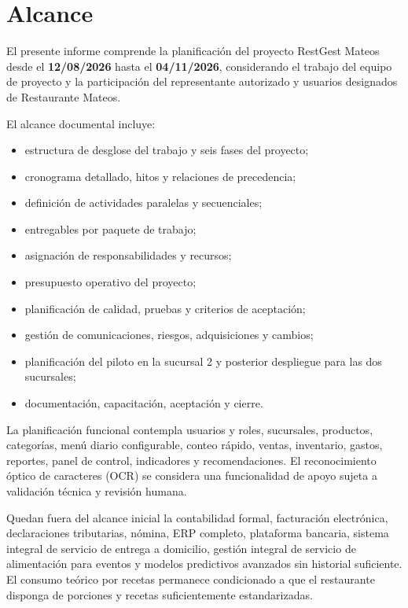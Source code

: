 \documentclass[12pt,a4paper]{article}
\begin{document}
\section{Alcance}

El presente informe comprende la planificación del proyecto RestGest Mateos desde el \textbf{12/08/2026} hasta el 
\textbf{04/11/2026}, considerando el trabajo del equipo de proyecto y la participación del representante autorizado y usuarios 
designados de Restaurante Mateos.

El alcance documental incluye:

\begin{itemize}
    \item estructura de desglose del trabajo y seis fases del proyecto;
    \item cronograma detallado, hitos y relaciones de precedencia;
    \item definición de actividades paralelas y secuenciales;
    \item entregables por paquete de trabajo;
    \item asignación de responsabilidades y recursos;
    \item presupuesto operativo del proyecto;
    \item planificación de calidad, pruebas y criterios de aceptación;
    \item gestión de comunicaciones, riesgos, adquisiciones y cambios;
    \item planificación del piloto en la sucursal 2 y posterior despliegue para las dos sucursales;
    \item documentación, capacitación, aceptación y cierre.
\end{itemize}

La planificación funcional contempla usuarios y roles, sucursales, productos, categorías, menú diario configurable, conteo rápido, 
ventas, inventario, gastos, reportes, panel de control, indicadores y recomendaciones. El reconocimiento óptico de caracteres (OCR) se 
considera una funcionalidad de apoyo sujeta a validación técnica y revisión humana.

Quedan fuera del alcance inicial la contabilidad formal, facturación electrónica, declaraciones tributarias, nómina, ERP completo, 
plataforma bancaria, sistema integral de servicio de entrega a domicilio, gestión integral de servicio de alimentación para eventos y modelos predictivos avanzados sin historial suficiente. 
El consumo teórico por recetas permanece condicionado a que el restaurante disponga de porciones y recetas suficientemente estandarizadas.
\end{document}
